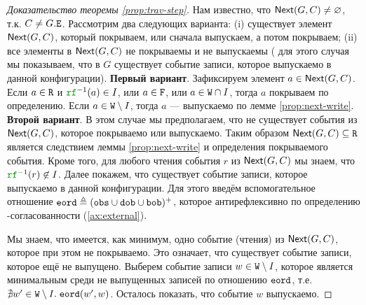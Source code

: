 \begin{proof}[Доказательство теоремы \ref{prop:trav-step}]
  Нам известно, что ${\sf Next}(G, C) \neq \varnothing$, т.к. $C \neq G.{\mathtt{E}}$.
  Рассмотрим два следующих варианта: (i) существует
  элемент ${\sf Next}(G, C)$, который покрываем, или сначала выпускаем, а потом покрываем; (ii) 
  все элементы в ${\sf Next}(G, C)$ не покрываемы и не выпускаемы (
  для этого случая мы показываем, что в $G$ существует событие записи, которое выпускаемо в данной конфигурации).
  {\bf Первый вариант}.
  Зафиксируем элемент $a \in {\sf Next}(G, C)$.
  Если $a \in {\mathtt{R}}$ и $\lRF^{-1}(a) \in \IssuedSet$, или $a \in {\mathtt{F}}$, или $a \in {\mathtt{W}} \cap I$,
  тогда $a$ покрываем по определению.
  Если $a \in {\mathtt{W}} \setminus I$, тогда $a$ --- выпускаемо по лемме \ref{prop:next-write}.
  {\bf Второй вариант}.
  В этом случае мы предполагаем, что не существует  события из ${\sf Next}(G, C)$, которое покрываемо или выпускаемо.
  Таким образом ${\sf Next}(G, C) \subseteq {\mathtt{R}}$ является следствием леммы \ref{prop:next-write} и определения покрываемого события.
  Кроме того, для любого чтения события $r$ из ${\sf Next}(G, C)$ мы знаем, что $\lRF^{-1}(r) \nin \IssuedSet$.
  Далее покажем, что существует событие записи, которое выпускаемо в данной конфигурации.
  Для этого введём вспомогательное отношение ${\mathtt{eord}} \triangleq ({\mathtt{obs}} \cup {\mathtt{dob}} \cup {\mathtt{bob}})^{+}$,
  которое антирефлексивно по определению \ARM-согласованности (\ref{ax:external}).
  
  Мы знаем, что имеется, как минимум, одно событие (чтения) из ${\sf Next}(G, C)$, которое при этом не покрываемо.
  Это означает, что существует событие записи, которое ещё не выпущено.
  Выберем событие записи $w \in {\mathtt{W}} \setminus I$, которое является минимальным среди не выпущенных записей по отношению ${\mathtt{eord}}$,
т.е. $\nexists w' \in {\mathtt{W}} \setminus I. \; {\mathtt{eord}}(w', w)$.
  Осталось показать, что событие $w$ выпускаемо.
  

\end{proof}

